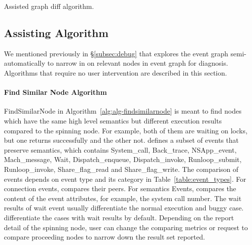 \begin{algorithm}[ht!]
    \caption{\xxx Assisted graph diff algorithm.}
    \label{alg:alg-graphdiff}
\begin{algorithmic}[1]
\Statex
{}
	\EndIf
	\EndIf
\EndFor
{}
\EndFunction
\end{algorithmic}
\end{algorithm}


\subsection{\xxx Assisting Algorithm}

We mentioned previously in \S\ref{subsec:debug} that \xxx explores the event
graph semi-automatically to narrow in on relevant nodes in event graph for
diagnosis. Algorithms that require no user intervention are described
in this section.

\paragraph{Find Similar Node Algorithm}

FindSimilarNode in Algorithm~\ref{alg:alg-findsimilarnode} is meant to find
nodes which have the same high level semantics but different execution results
compared to the spinning node. For example, both of them are waiting on locks,
but one returns successfully and the other not. \xxx defines a subset of events
that preserve semantics, which contains System\_call, Back\_trace, NSApp\_event,
Mach\_message, Wait, Dispatch\_enqueue, Dispatch\_invoke, Runloop\_submit,
Runloop\_invoke, Share\_flag\_read and Share\_flag\_write. The comparison of
events depends on event type and its category in Table~\ref{table:event_types}.
For connection events, \xxx compares their peers. For semantics Events, \xxx
compares the content of the event attributes, for example, the system call
number. The wait results of wait event usually differentiate the normal
execution and buggy case. \xxx differentiate the cases with wait results by
default. Depending on the report detail of the spinning node, user can change
the comparing metrics or request \xxx to compare proceeding nodes to narrow down
the result set reported.

